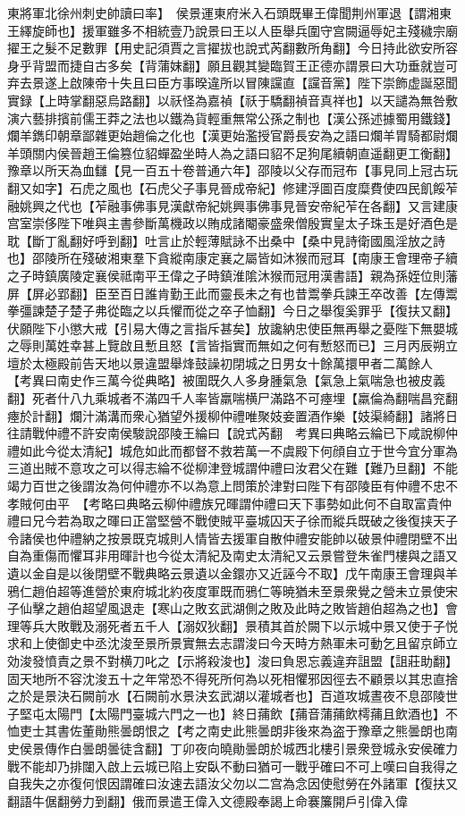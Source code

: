 東將軍北徐州刺史帥讀曰率】　侯景運東府米入石頭既畢王偉聞荆州軍退【謂湘東王繹旋師也】援軍雖多不相統壹乃說景曰王以人臣舉兵圍守宫闕逼辱妃主殘穢宗廟擢王之髮不足數罪【用史記須賈之言擢拔也說式芮翻數所角翻】今日持此欲安所容身乎背盟而捷自古多矣【背蒲妺翻】願且觀其變臨賀王正德亦謂景曰大功垂就豈可弃去景遂上啟陳帝十失且曰臣方事暌違所以冒陳讜直【讜音黨】陛下崇飾虚誕惡聞實録【上時掌翻惡烏路翻】以祅怪為嘉禎【祅于驕翻禎音真祥也】以天譴為無咎敷演六藝排擯前儒王莽之法也以鐵為貨輕重無常公孫之制也【漢公孫述據蜀用鐵錢】爛羊鐫印朝章鄙雜更始趙倫之化也【漢更始濫授官爵長安為之語曰爛羊胃騎都尉爛羊頭關内侯晉趙王倫篡位貂蟬盈坐時人為之語曰貂不足狗尾續朝直遥翻更工衡翻】豫章以所天為血讎【見一百五十卷普通六年】邵陵以父存而冠布【事見同上冠古玩翻又如字】石虎之風也【石虎父子事見晉成帝紀】修建浮圖百度糜費使四民飢餒苲融姚興之代也【苲融事佛事見漢獻帝紀姚興事佛事見晉安帝紀苲在各翻】又言建康宫室崇侈陛下唯與主書參斷萬機政以賄成諸閹豪盛衆僧殷實皇太子珠玉是好酒色是耽【斷丁亂翻好呼到翻】吐言止於輕薄賦詠不出桑中【桑中見詩衛國風淫放之詩也】邵陵所在殘破湘東羣下貪縱南康定襄之屬皆如沐猴而冠耳【南康王會理帝子續之子時鎮廣陵定襄侯祗南平王偉之子時鎮淮隂沐猴而冠用漢書語】親為孫姪位則藩屏【屏必郢翻】臣至百日誰肯勤王此而靈長未之有也昔鬻拳兵諫王卒改善【左傳鬻拳彊諫楚子楚子弗從臨之以兵懼而從之卒子恤翻】今日之舉復奚罪乎【復扶又翻】伏願陛下小懲大戒【引易大傳之言指斥甚矣】放讒納忠使臣無再舉之憂陛下無嬰城之辱則萬姓幸甚上覽啟且慙且怒【言皆指實而無如之何有慙怒而已】三月丙辰朔立壇於太極殿前告天地以景違盟舉烽鼓譟初閉城之日男女十餘萬擐甲者二萬餘人　【考異曰南史作三萬今從典略】被圍既久人多身腫氣急【氣急上氣喘急也被皮義翻】死者什八九乘城者不滿四千人率皆羸喘横尸滿路不可瘞埋【羸倫為翻喘昌兖翻瘞於計翻】爛汁滿溝而衆心猶望外援柳仲禮唯聚妓妾置酒作樂【妓渠綺翻】諸將日往請戰仲禮不許安南侯駿說邵陵王綸曰【說式芮翻　考異曰典略云綸已下咸說柳仲禮如此今從太清紀】城危如此而都督不救若萬一不虞殿下何顔自立于世今宜分軍為三道出賊不意攻之可以得志綸不從柳津登城謂仲禮曰汝君父在難【難乃旦翻】不能竭力百世之後謂汝為何仲禮亦不以為意上問策於津對曰陛下有邵陵臣有仲禮不忠不孝賊何由平　【考略曰典略云柳仲禮族兄暉謂仲禮曰天下事勢如此何不自取富貴仲禮曰兄今若為取之暉曰正當堅營不戰使賊平臺城囚天子徐而縱兵既破之後復挟天子令諸侯也仲禮納之按景既克城則人情皆去援軍自散仲禮安能帥以破景仲禮閉壁不出自為重傷而懼耳非用暉計也今從太清紀及南史太清紀又云景嘗登朱雀門樓與之語又遺以金自是以後閉壁不戰典略云景遺以金鐶亦又近誣今不取】戊午南康王會理與羊鴉仁趙伯超等進營於東府城北約夜度軍既而鴉仁等暁猶未至景衆覺之營未立景使宋子仙擊之趙伯超望風退走【寒山之敗玄武湖側之敗及此時之敗皆趙伯超為之也】會理等兵大敗戰及溺死者五千人【溺奴狄翻】景積其首於闕下以示城中景又使于子悦求和上使御史中丞沈浚至景所景實無去志謂浚曰今天時方熱軍未可動乞且留京師立効浚發憤責之景不對横刀叱之【示將殺浚也】浚曰負恩忘義違弃詛盟【詛莊助翻】固天地所不容沈浚五十之年常恐不得死所何為以死相懼邪因徑去不顧景以其忠直捨之於是景決石闕前水【石闕前水景決玄武湖以灌城者也】百道攻城晝夜不息邵陵世子堅屯太陽門【太陽門臺城六門之一也】終日蒱飲【蒱音蒲蒱飲樗蒱且飲酒也】不恤吏士其書佐董勛熊曇朗恨之【考之南史此熊曇朗非後來為盗于豫章之熊曇朗也南史侯景傳作白曇朗曇徒含翻】丁卯夜向曉勛曇朗於城西北樓引景衆登城永安侯確力戰不能却乃排闥入啟上云城已陷上安臥不動曰猶可一戰乎確曰不可上嘆曰自我得之自我失之亦復何恨因謂確曰汝速去語汝父勿以二宫為念因使慰勞在外諸軍【復扶又翻語牛倨翻勞力到翻】俄而景遣王偉入文德殿奉謁上命褰簾開戶引偉入偉